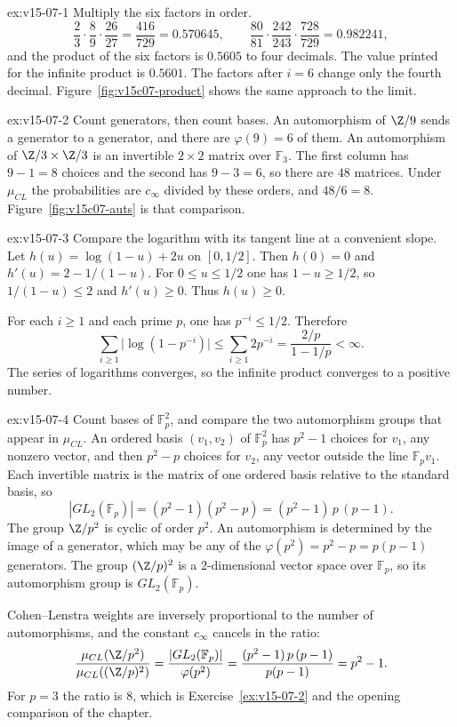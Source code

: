 \begin{solution}{ex:v15-07-1}
\idea Multiply the six factors in order.
\writeup
\[
\frac23\cdot\frac89\cdot\frac{26}{27}=\frac{416}{729}=0.570645,\qquad
\frac{80}{81}\cdot\frac{242}{243}\cdot\frac{728}{729}=0.982241,
\]
and the product of the six factors is \(0.5605\) to four decimals. The value printed for the infinite product is \(0.5601\). The factors after \(i=6\) change only the fourth decimal. Figure~\ref{fig:v15c07-product} shows the same approach to the limit.
\end{solution}

\begin{solution}{ex:v15-07-2}
\idea Count generators, then count bases.
\writeup An automorphism of \(\Z/9\) sends a generator to a generator, and there are \(\varphi(9)=6\) of them. An automorphism of \(\Z/3\times\Z/3\) is an invertible \(2\times2\) matrix over \(\mathbb F_3\). The first column has \(9-1=8\) choices and the second has \(9-3=6\), so there are \(48\) matrices. Under \(\mu_{CL}\) the probabilities are \(c_\infty\) divided by these orders, and \(48/6=8\). Figure~\ref{fig:v15c07-auts} is that comparison.
\end{solution}

\begin{solution}{ex:v15-07-3}
\idea Compare the logarithm with its tangent line at a convenient slope.
\writeup Let \(h(u)=\log(1-u)+2u\) on \([0,1/2]\). Then \(h(0)=0\) and \(h'(u)=2-1/(1-u)\). For \(0\le u\le1/2\) one has \(1-u\ge1/2\), so \(1/(1-u)\le2\) and \(h'(u)\ge0\). Thus \(h(u)\ge0\).

For each \(i\ge1\) and each prime \(p\), one has \(p^{-i}\le1/2\). Therefore
\[
\sum_{i\ge1}\bigl|\log(1-p^{-i})\bigr|\le\sum_{i\ge1}2p^{-i}=\frac{2/p}{1-1/p}<\infty.
\]
The series of logarithms converges, so the infinite product converges to a positive number.
\end{solution}

\begin{solution}{ex:v15-07-4}
\idea Count bases of \(\mathbb F_p^2\), and compare the two automorphism groups that appear in \(\mu_{CL}\).
\writeup An ordered basis \((v_1,v_2)\) of \(\mathbb F_p^2\) has \(p^2-1\) choices for \(v_1\), any nonzero vector, and then \(p^2-p\) choices for \(v_2\), any vector outside the line \(\mathbb F_p v_1\). Each invertible matrix is the matrix of one ordered basis relative to the standard basis, so
\[
|GL_2(\mathbb F_p)|=(p^2-1)(p^2-p)=(p^2-1)\,p\,(p-1).
\]
The group \(\Z/p^2\) is cyclic of order \(p^2\). An automorphism is determined by the image of a generator, which may be any of the \(\varphi(p^2)=p^2-p=p(p-1)\) generators. The group \((\Z/p)^2\) is a \(2\)-dimensional vector space over \(\mathbb F_p\), so its automorphism group is \(GL_2(\mathbb F_p)\).

Cohen--Lenstra weights are inversely proportional to the number of automorphisms, and the constant \(c_\infty\) cancels in the ratio:
\[
\frac{\mu_{CL}(\Z/p^2)}{\mu_{CL}((\Z/p)^2)}
=\frac{|GL_2(\mathbb F_p)|}{\varphi(p^2)}
=\frac{(p^2-1)\,p\,(p-1)}{p(p-1)}=p^2-1.
\]
For \(p=3\) the ratio is \(8\), which is Exercise~\ref{ex:v15-07-2} and the opening comparison of the chapter.
\end{solution}

